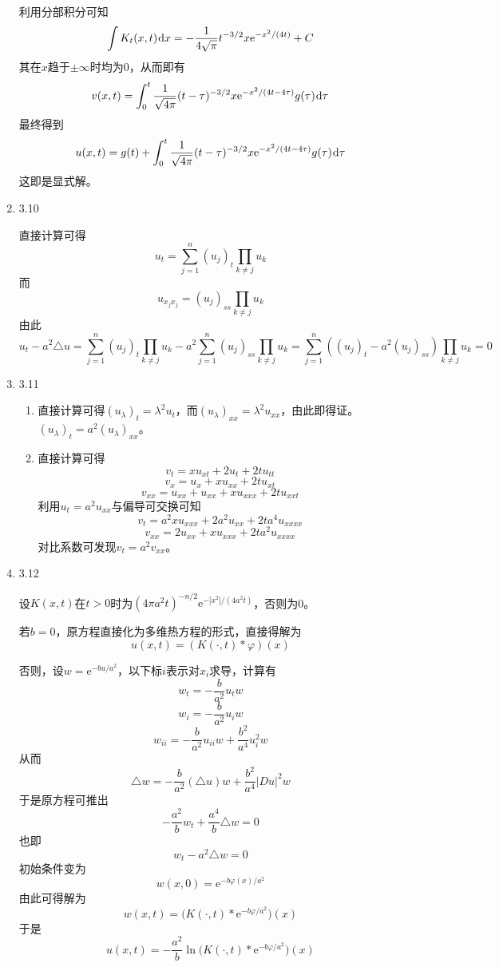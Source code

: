\documentclass[a4paper,UTF8,fontset=windows,10pt]{ctexart}
\newcommand*{\dr}{\hspace{0.07em}\mathrm{d}}
\newcommand*{\er}{\mathrm{e}}
\begin{document}
\begin{enumerate}
    利用分部积分可知
    $$\int K_t(x,t)\dr x=-\frac{1}{4\sqrt\pi}t^{-3/2}x\er^{-x^2/(4t)}+C$$
    其在$x$趋于$\pm\infty$时均为0，从而即有
    $$v(x,t)=\int_0^t\frac{1}{\sqrt{4\pi}}(t-\tau)^{-3/2}x\er^{-x^2/(4t-4\tau)}g(\tau)\dr\tau$$
    最终得到
    $$u(x,t)=g(t)+\int_0^t\frac{1}{\sqrt{4\pi}}(t-\tau)^{-3/2}x\er^{-x^2/(4t-4\tau)}g(\tau)\dr\tau$$
    这即是显式解。
    
    \item 3.10
    
    直接计算可得
    $$u_t=\sum_{j=1}^n(u_j)_t\prod_{k\ne j}u_k$$
    而
    $$u_{x_jx_j}=(u_j)_{ss}\prod_{k\ne j}u_k$$
    由此
    $$u_t-a^2\triangle u=\sum_{j=1}^n(u_j)_t\prod_{k\ne j}u_k-a^2\sum_{j=1}^n(u_j)_{ss}\prod_{k\ne j}u_k=\sum_{j=1}^n((u_j)_t-a^2(u_j)_{ss})\prod_{k\ne j}u_k=0$$
    
    \item 3.11
    \begin{enumerate}[(1)]
        \item 直接计算可得$(u_\lambda)_t=\lambda^2u_t$，而$(u_\lambda)_{xx}=\lambda^2u_{xx}$，由此即得证。$(u_\lambda)_t=a^2(u_\lambda)_{xx}$。
        \item 直接计算可得
        $$v_t=xu_{xt}+2u_t+2tu_{tt}$$
        $$v_x=u_x+xu_{xx}+2tu_{xt}$$
        $$v_{xx}=u_{xx}+u_{xx}+xu_{xxx}+2tu_{xxt}$$
        利用$u_t=a^2u_{xx}$与偏导可交换可知
        $$v_t=a^2xu_{xxx}+2a^2u_{xx}+2ta^4u_{xxxx}$$
        $$v_{xx}=2u_{xx}+xu_{xxx}+2ta^2u_{xxxx}$$
        对比系数可发现$v_t=a^2v_{xx}$。
    \end{enumerate}
    
    \item 3.12
    
    设$K(x,t)$在$t>0$时为$(4\pi a^2t)^{-n/2}\er^{-|x^2|/(4a^2t)}$，否则为0。
    
    若$b=0$，原方程直接化为多维热方程的形式，直接得解为
    $$u(x,t)=(K(\cdot,t)*\varphi)(x)$$
    
    否则，设$w=\er^{-bu/a^2}$，以下标$i$表示对$x_i$求导，计算有
    $$w_t=-\frac{b}{a^2}u_tw$$
    $$w_i=-\frac{b}{a^2}u_iw$$
    $$w_{ii}=-\frac{b}{a^2}u_{ii}w+\frac{b^2}{a^4}u_i^2w$$
    从而
    $$\triangle w=-\frac{b}{a^2}(\triangle u)w+\frac{b^2}{a^4}|Du|^2w$$
    于是原方程可推出
    $$-\frac{a^2}{b}w_t+\frac{a^4}{b}\triangle w=0$$
    也即
    $$w_t-a^2\triangle w=0$$
    初始条件变为
    $$w(x,0)=\er^{-b\varphi(x)/a^2}$$
    由此可得解为
    $$w(x,t)=\big(K(\cdot,t)*\er^{-b\varphi/a^2}\big)(x)$$
    于是
    $$u(x,t)=-\frac{a^2}{b}\ln\big(K(\cdot,t)*\er^{-b\varphi/a^2}\big)(x)$$
    

\end{enumerate}
\end{document}
